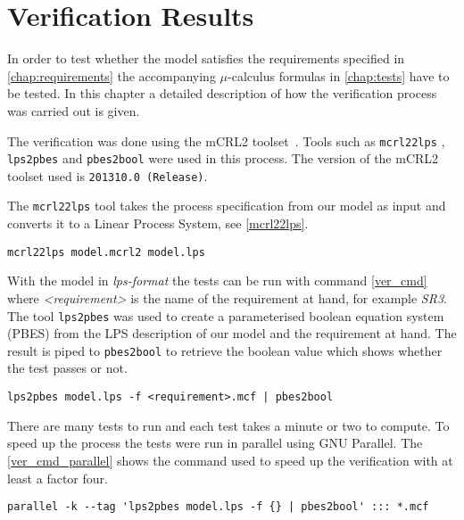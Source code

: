 \chapter{Verification Results}	\label{chap:verification}
	In order to test whether the model satisfies the requirements specified in \cref{chap:requirements} the accompanying $\mu$-calculus formulas in \cref{chap:tests} have to be tested.
	In this chapter a detailed description of how the verification process was carried out is given.
	
	The verification was done using the mCRL2 toolset~\cite{mcrl2website}. 
	Tools such as \texttt{mcrl22lps} , \texttt{lps2pbes} and \texttt{pbes2bool} were used in this process.
	The version of the mCRL2 toolset used is \texttt{201310.0 (Release)}.
	
	The \texttt{mcrl22lps} tool takes the process specification from our model as input and converts it to a Linear Process System, see \cref{mcrl22lps}. 
	
	\begin{lstlisting}[caption=Transformation of mCRL2 model to LPS description, label=mcrl22lps ]
	mcrl22lps model.mcrl2 model.lps
	\end{lstlisting}
	
	With the model in {\em lps-format} the tests can be run with command
	\cref{ver_cmd} where {\em <requirement>} is the name of	the requirement at hand, for example {\em SR3}.
	The tool \texttt{lps2pbes} was used to create a parameterised boolean equation system (PBES) from the LPS description of our model and the requirement at hand.
	The result is piped to \texttt{pbes2bool} to retrieve
	the boolean value which shows whether the test passes or not.
	 
	\begin{lstlisting}[caption=Requirement testing ,label=ver_cmd] 
	lps2pbes model.lps -f <requirement>.mcf | pbes2bool
	\end{lstlisting}

	There are many tests to run and  each test takes a minute or two to compute. To speed up the process the tests were run in parallel using GNU Parallel\cite{Tange2011a}. The \cref{ver_cmd_parallel} shows
	the command used to speed up the verification with at least a factor four.
	\begin{lstlisting}[caption=Parallelization of verification command, label=ver_cmd_parallel]
	parallel -k --tag 'lps2pbes model.lps -f {} | pbes2bool' ::: *.mcf
	\end{lstlisting}
	
